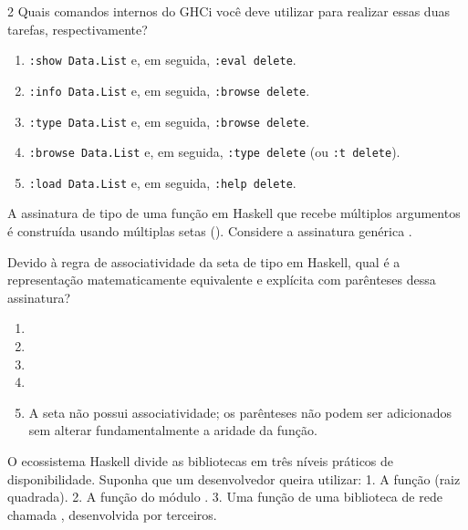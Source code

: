 \documentclass[a4paper,10pt,brazil]{article}
\begin{document}
\begin{multicols}{2}
Quais comandos internos do GHCi você deve utilizar para realizar essas duas tarefas, respectivamente?

\begin{enumerate}
  \item \texttt{:show Data.List} e, em seguida, \texttt{:eval delete}.

  \item \texttt{:info Data.List} e, em seguida, \texttt{:browse delete}.

  \item \texttt{:type Data.List} e, em seguida, \texttt{:browse delete}.

  \item \texttt{:browse Data.List} e, em seguida, \texttt{:type delete} (ou \texttt{:t delete}).

  \item \texttt{:load Data.List} e, em seguida, \texttt{:help delete}.


\end{enumerate}

A assinatura de tipo de uma função em Haskell que recebe múltiplos argumentos é construída usando múltiplas setas (\haskellinline{->}). Considere a assinatura genérica . 

Devido à regra de associatividade da seta de tipo em Haskell, qual é a representação matematicamente equivalente e explícita com parênteses dessa assinatura?

\begin{enumerate}
  \item {}

  \item {}

  \item {}

  \item {}

  \item A seta não possui associatividade; os parênteses não podem ser adicionados sem alterar fundamentalmente a aridade da função.


\end{enumerate}

O ecossistema Haskell divide as bibliotecas em três níveis práticos de disponibilidade. Suponha que um desenvolvedor queira utilizar:
1. A função  (raiz quadrada).
2. A função  do módulo .
3. Uma função de uma biblioteca de rede chamada , desenvolvida por terceiros.


\end{multicols}
\end{document}
